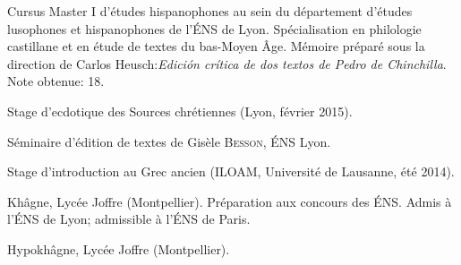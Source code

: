 \begin{rubric}{Cursus}
                                \entry*[2014-2015]
                            Master I d'études hispanophones au sein du département d'études
                        lusophones et hispanophones de l'ÉNS de Lyon. Spécialisation en philologie
                        castillane et en étude de textes du bas-Moyen Âge. Mémoire préparé sous la
                        direction de Carlos Heusch:\textit{Edición crítica de dos textos de Pedro de
                        Chinchilla}. Note obtenue: 18.
                    
                                \entry*
                            Stage d’ecdotique des Sources chrétiennes (Lyon, février
                        2015).
                    
                                \entry*[2013-2014]
                            Séminaire d’édition de textes de Gisèle
                        \textsc{Besson}, ÉNS Lyon.
                    
                                \entry*
                            Stage d'introduction au Grec ancien (ILOAM, Université de Lausanne,
                        été 2014).
                    
                                \entry*[2012-2013]
                            Khâgne, Lycée Joffre (Montpellier). Préparation aux concours des ÉNS.
                        Admis à l'ÉNS de Lyon; admissible à l'ÉNS de Paris.
                    
                                \entry*[2011-2012]
                            Hypokhâgne, Lycée Joffre (Montpellier).
                    \end{rubric}





